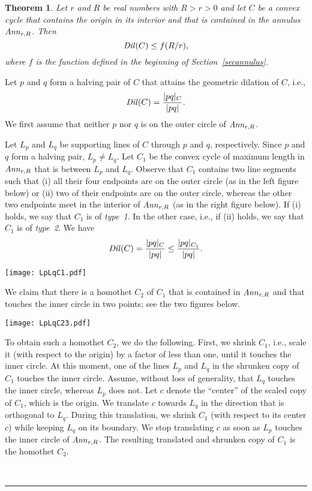 \documentclass[12pt]{article}
\newtheorem{theorem}{Theorem}
\newcommand{\Ann}{\mathord{\it Ann}}
\newcommand{\Dil}{\mathord{\it Dil}}
\newcommand{\qed}{\rule{0.5em}{1.5ex}}
\newcommand{\fqed}{{\hfill~\qed}}
\newenvironment{proof}{{\noindent \bf Proof.}}
                      {{\hfill \fqed} \vspace{1em}}
\begin{document}
\begin{theorem}    \label{thmcycle}  
Let $r$ and $R$ be real numbers with $R>r>0$ and let $C$ be a convex 
cycle that contains the origin in its interior and that is contained in 
the annulus $\Ann_{r,R}$. Then  
\[ \Dil(C) \leq f(R/r) , 
\] 
where $f$ is the function defined in the beginning of 
Section~\ref{secannulus}. 
\end{theorem} 
\begin{proof} 
Let $p$ and $q$ form a halving pair of $C$ that attains the geometric 
dilation of $C$, i.e., 
\[ \Dil(C) = \frac{|pq|_C}{|pq|} .  
\]  
We first assume that neither $p$ nor $q$ is on the outer circle of 
$\Ann_{r,R}$. 
 
Let $L_p$ and $L_q$ be supporting lines of $C$ through $p$ and $q$, 
respectively. Since $p$ and $q$ form a halving pair, $L_p \neq L_q$.  
Let $C_1$ be the convex cycle of maximum length in $\Ann_{r,R}$ that is 
between $L_p$ and $L_q$. Observe that $C_1$ contains two line segments 
such that (i) all their four endpoints are on the outer circle (as in 
the left figure below) or (ii) two of their endpoints are on the outer 
circle, whereas the other two endpoints meet in the interior of 
$\Ann_{r,R}$ (as in the right figure below). If (i) holds, we say that 
$C_1$ is of \emph{type~1}. In the other case, i.e., if (ii) holds, we 
say that $C_1$ is of \emph{type~2}. We have 
\[ \Dil(C) = \frac{|pq|_C}{|pq|} \leq \frac{|pq|_{C_1}}{|pq|} . 
\]  

\begin{center}
   \texttt{[image: LpLqC1.pdf]}
\end{center}

We claim that there is a homothet $C_2$ of $C_1$ that is contained in 
$\Ann_{r,R}$ and that touches the inner circle in two points; see the 
two figures below. 

\begin{center}
   \texttt{[image: LpLqC23.pdf]}
\end{center}

To obtain such a homothet $C_2$, we do the following. First, we shrink 
$C_1$, i.e., scale it (with respect to the origin) by a factor of less 
than one, until it touches the inner circle. At this moment, one 
of the lines $L_p$ and $L_q$ in the shrunken copy of $C_1$ touches 
the inner circle. Assume, without loss of generality, that $L_q$ 
touches the inner circle, whereas $L_p$ does not. Let $c$ denote 
the ``center'' of the scaled copy of $C_1$, which is the origin. 
We translate $c$ towards $L_q$ in the direction that is orthogonal to 
$L_q$. During this translation, we shrink $C_1$ (with respect to its 
center $c$) while keeping $L_q$ on its boundary. We stop translating 
$c$ as soon as $L_p$ touches the inner circle of $\Ann_{r,R}$.
The resulting translated and shrunken copy of $C_1$ is the homothet 
$C_2$. 


\end{proof}
\end{document}
